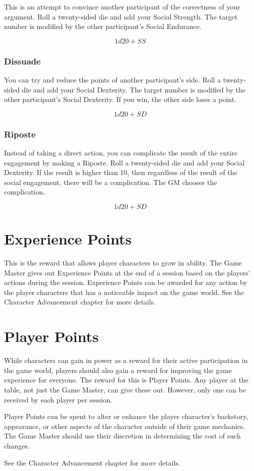 \begin{multicols}{2}
This is an attempt to convince another participant of the correctness of your argument. Roll a
twenty-sided die and add your Social Strength. The target number is modified by the other
participant's Social Endurance.

$$1d20 + SS$$

\subsubsection{Dissuade}

You can try and reduce the points of another participant's side. Roll a twenty-sided die
and add your Social Dexterity. The target number is modified by the other participant's
Social Dexterity. If you win, the other side loses a point.

$$1d20 + SD$$

\subsubsection{Riposte}

Instead of taking a direct action, you can complicate the result of the entire engagement
by making a Riposte. Roll a twenty-sided die and add your Social Dexterity. If the result
is higher than 10, then regardless of the result of the social engagement, there will be
a complication. The GM chooses the complication.

$$1d20 + SD$$

\section{Experience Points}

This is the reward that allows player characters to grow in ability. The Game Master gives
out Experience Points at the end of a session based on the players' actions during the
session. Experience Points can be awarded for any action by the player characters that
has a noticeable impact on the game world. See the Character Advancement chapter for
more details.

\section{Player Points}

While characters can gain in power as a reward for their active participation in the game
world, players should also gain a reward for improving the game experience for everyone.
The reward for this is Player Points. Any player at the table, not just the Game Master,
can give these out. However, only one can be received by each player per session.

Player Points can be spent to alter or enhance the player character's backstory, appearance,
or other aspects of the character outside of their game mechanics. The Game Master should
use their discretion in determining the cost of such changes.

See the Character Advancement chapter for more details.

\end{multicols}
